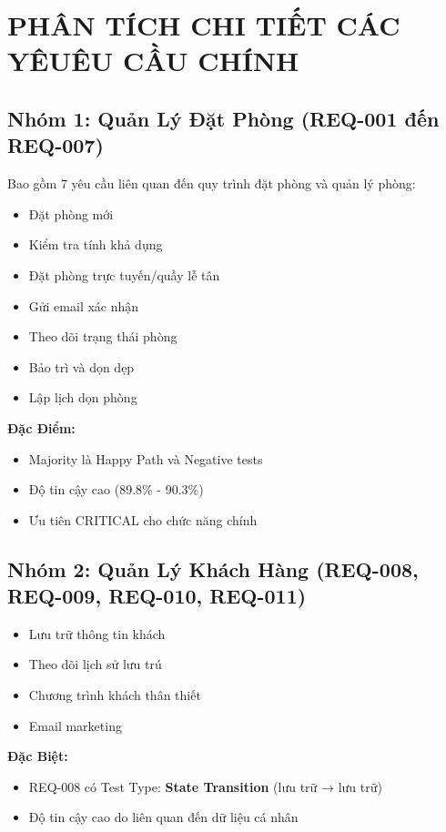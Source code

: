 \documentclass[12pt, a4paper]{article}
\begin{document}
\newpage

\section{PHÂN TÍCH CHI TIẾT CÁC YÊUÊU CẦU CHÍNH}

\subsection{Nhóm 1: Quản Lý Đặt Phòng (REQ-001 đến REQ-007)}

Bao gồm 7 yêu cầu liên quan đến quy trình đặt phòng và quản lý phòng:
\begin{itemize}
    \item Đặt phòng mới
    \item Kiểm tra tính khả dụng
    \item Đặt phòng trực tuyến/quầy lễ tân
    \item Gửi email xác nhận
    \item Theo dõi trạng thái phòng
    \item Bảo trì và dọn dẹp
    \item Lập lịch dọn phòng
\end{itemize}

\textbf{Đặc Điểm:}
\begin{itemize}
    \item Majority là Happy Path và Negative tests
    \item Độ tin cậy cao (89.8\% - 90.3\%)
    \item Ưu tiên CRITICAL cho chức năng chính
\end{itemize}

\subsection{Nhóm 2: Quản Lý Khách Hàng (REQ-008, REQ-009, REQ-010, REQ-011)}

\begin{itemize}
    \item Lưu trữ thông tin khách
    \item Theo dõi lịch sử lưu trú
    \item Chương trình khách thân thiết
    \item Email marketing
\end{itemize}

\textbf{Đặc Biệt:}
\begin{itemize}
    \item REQ-008 có Test Type: \textbf{State Transition} (lưu trữ → lưu trữ)
    \item Độ tin cậy cao do liên quan đến dữ liệu cá nhân
\end{itemize}
\end{document}
